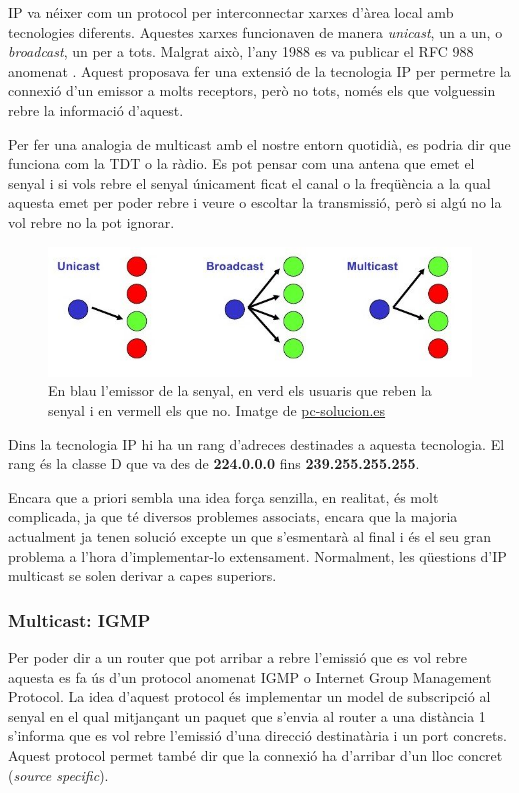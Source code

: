 {
    \ac{IP} va néixer com un protocol per interconnectar xarxes d'àrea local amb tecnologies diferents. Aquestes xarxes funcionaven de manera
    \textit{unicast}, un a un, o \textit{broadcast}, un per a tots. Malgrat això, l'any 1988 es va publicar el RFC 988 anomenat \cite{Host Extension for IP
    Multicasting}. Aquest proposava fer una extensió de la tecnologia IP per permetre la connexió d'un emissor a molts receptors, però no tots, només els
    que volguessin rebre la informació d'aquest.
    
    Per fer una analogia de multicast amb el nostre entorn quotidià, es podria dir que funciona com la \ac{TDT} o la ràdio. Es pot pensar com una antena que
    emet el senyal i si vols rebre el senyal únicament ficat el canal o la freqüència a la qual aquesta emet per poder rebre i veure o escoltar la
    transmissió, però si algú no la vol rebre no la pot ignorar.

    \begin{figure}[H]
        \label{fig:unicast_vs_broadcast_vs_multicast}
        \centering
        \includegraphics[width=\textwidth]{img/02_stateofart/unicast_vs_broadcast_vs_multicast.jpg}
        \caption[Unicast vs Broadcast vs Multicast]{\footnotesize{En blau l'emissor de la senyal, en verd els usuaris que reben la senyal
        i en vermell els que no. Imatge de \url{pc-solucion.es}}}
    \end{figure}

    Dins la tecnologia IP hi ha un rang d'adreces destinades a aquesta tecnologia. El rang és la classe D que va des de \textbf{224.0.0.0} fins
    \textbf{239.255.255.255}.
    
    Encara que a priori sembla una idea força senzilla, en realitat, és molt complicada, ja que té diversos problemes associats, encara que la majoria
    actualment ja tenen solució excepte un que s'esmentarà al final i és el seu gran problema a l'hora d'implementar-lo extensament. Normalment,
    les qüestions d'IP multicast se solen derivar a capes superiors.
}

\subsubsection{Multicast: IGMP}
{
    Per poder dir a un router que pot arribar a rebre l'emissió que es vol rebre aquesta es fa ús d'un protocol anomenat \ac{IGMP} o Internet Group
    Management Protocol. La idea d'aquest protocol és implementar un model de subscripció al senyal en el qual mitjançant un paquet que s'envia al
    router a una distància 1 s'informa que es vol rebre l'emissió d'una direcció destinatària i un port concrets. Aquest protocol permet també dir
    que la connexió ha d'arribar d'un lloc concret (\textit{source specific}).
}

